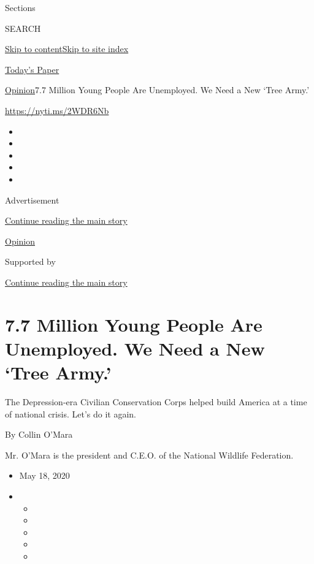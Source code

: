 Sections

SEARCH

\protect\hyperlink{site-content}{Skip to
content}\protect\hyperlink{site-index}{Skip to site index}

\href{https://myaccount.nytimes3xbfgragh.onion/auth/login?response_type=cookie\&client_id=vi}{}

\href{https://www.nytimes3xbfgragh.onion/section/todayspaper}{Today's
Paper}

\href{/section/opinion}{Opinion}\textbar{}7.7 Million Young People Are
Unemployed. We Need a New `Tree Army.'

\url{https://nyti.ms/2WDR6Nb}

\begin{itemize}
\item
\item
\item
\item
\item
\end{itemize}

Advertisement

\protect\hyperlink{after-top}{Continue reading the main story}

\href{/section/opinion}{Opinion}

Supported by

\protect\hyperlink{after-sponsor}{Continue reading the main story}

\hypertarget{77-million-young-people-are-unemployed-we-need-a-new-tree-army}{%
\section{7.7 Million Young People Are Unemployed. We Need a New `Tree
Army.'}\label{77-million-young-people-are-unemployed-we-need-a-new-tree-army}}

The Depression-era Civilian Conservation Corps helped build America at a
time of national crisis. Let's do it again.

By Collin O'Mara

Mr. O'Mara is the president and C.E.O. of the National Wildlife
Federation.

\begin{itemize}
\item
  May 18, 2020
\item
  \begin{itemize}
  \item
  \item
  \item
  \item
  \item
  \end{itemize}
\end{itemize}

